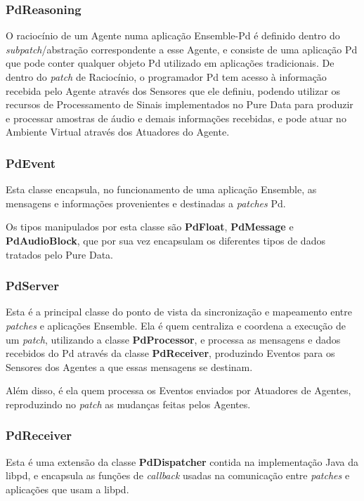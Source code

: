 \documentclass[a4paper, 11pt, twoside]{article}
\begin{document}
\begin{multicols}{2}
\subsubsection{PdReasoning}

O raciocínio de um Agente numa aplicação Ensemble-Pd é definido dentro do
\textit{subpatch}/abstração correspondente a esse Agente, e consiste de
uma aplicação Pd que pode conter qualquer objeto Pd utilizado em aplicações
tradicionais. De dentro do \textit{patch} de Raciocínio, o programador Pd tem 
acesso à informação recebida pelo Agente através dos Sensores que ele definiu,
podendo utilizar os recursos de Processamento de Sinais implementados no Pure
Data para produzir e processar amostras de áudio e demais informações 
recebidas, e pode atuar no Ambiente Virtual através dos Atuadores do Agente.

\subsubsection{PdEvent}

Esta classe encapsula, no funcionamento de uma aplicação Ensemble,
as mensagens e informações provenientes e destinadas a \textit{patches} Pd.

Os tipos manipulados por esta classe são \textbf{PdFloat}, \textbf{PdMessage} e
\textbf{PdAudioBlock}, que por sua vez encapsulam os diferentes tipos de dados
tratados pelo Pure Data.

\subsubsection{PdServer}

Esta é a principal classe do ponto de vista da sincronização 
e mapeamento entre \textit{patches} e aplicações Ensemble.
Ela é quem centraliza e coordena a execução de um \textit{patch}, utilizando
a classe \textbf{PdProcessor}, e processa as mensagens e dados recebidos do Pd 
através da classe \textbf{PdReceiver}, produzindo Eventos para os Sensores 
dos Agentes a que essas mensagens se destinam.

Além disso, é ela quem processa os Eventos enviados por Atuadores de Agentes,
reproduzindo no \textit{patch} as mudanças feitas pelos Agentes.

\subsubsection{PdReceiver}

Esta é uma extensão da classe \textbf{PdDispatcher} contida na implementação
Java da libpd, e encapsula as funções de \textit{callback} usadas na
comunicação entre \textit{patches} e aplicações que usam a libpd.


\end{multicols}
\end{document}
